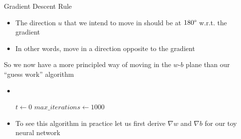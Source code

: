\begin{frame}
	\begin{overlayarea}{\textwidth}{\textheight}
		\begin{block}{Gradient Descent Rule}
			\begin{itemize}\justifying
				\item<1-> The direction $u$ that we intend to move in should be at $180\degree$ w.r.t. the gradient
				\item<2-> In other words, move in a direction opposite to the gradient
			\end{itemize}
		\end{block}
		 {So we now have a more principled way of moving in the $w$-$b$ plane than our ``guess work'' algorithm}
	\end{overlayarea}
\end{frame}

\begin{frame}
	\begin{overlayarea}{\textwidth}{\textheight}
		\begin{itemize}\justifying
			\item <1-> \\
			      \onslide<2-> {
				      \begin{algorithm}[H]
					      \SetAlgoLined
					      $t \leftarrow 0$\;
					      $max\_iterations\leftarrow 1000$\;
					      \caption{gradient\_descent()}
				      \end{algorithm}
			      }
			\item <3-> To see this algorithm in practice let us first derive $\nabla w$ and $\nabla b$ for our toy neural network
		\end{itemize}
	\end{overlayarea}
\end{frame}

